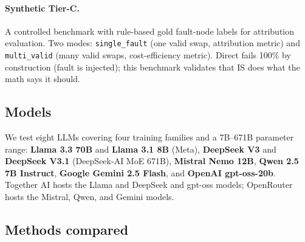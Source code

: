 \paragraph{Synthetic Tier-C.} A controlled benchmark with rule-based
gold fault-node labels for attribution evaluation. Two modes:
\texttt{single\_fault} (one valid swap, attribution metric) and
\texttt{multi\_valid} (many valid swaps, cost-efficiency metric).
Direct fails 100\% by construction (fault is injected); this
benchmark validates that IS does what the math says it should.

\subsection{Models}

We test eight LLMs covering four training families and a
7B--671B parameter range: \textbf{Llama 3.3 70B} and
\textbf{Llama 3.1 8B} (Meta), \textbf{DeepSeek V3} and
\textbf{DeepSeek V3.1} (DeepSeek-AI MoE 671B), \textbf{Mistral
Nemo 12B}, \textbf{Qwen 2.5 7B Instruct}, \textbf{Google Gemini
2.5 Flash}, and \textbf{OpenAI gpt-oss-20b}. Together AI hosts
the Llama and DeepSeek and gpt-oss models; OpenRouter hosts the
Mistral, Qwen, and Gemini models.

\subsection{Methods compared}

